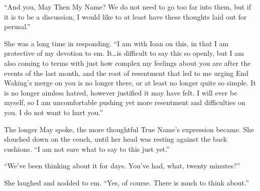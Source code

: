 ``And you, May Then My Name? We do not need to go too far into them, but if it is to be a discussion, I would like to at least have these thoughts laid out for perusal.''

She was a long time in responding. ``I am with Ioan on this, in that I am protective of my devotion to em. It\ldots is difficult to say this so openly, but I am also coming to terms with just how complex my feelings about you are after the events of the last month, and the root of resentment that led to me urging End Waking's merge on you is no longer there, or at least no longer quite so simple. It is no longer aimless hatred, however justified it may have felt. I will ever be myself, so I am uncomfortable pushing yet more resentment and difficulties on you. I do not want to hurt you.''

The longer May spoke, the more thoughtful True Name's expression became. She slouched down on the couch, until her head was resting against the back cushions. ``I am not sure what to say to this just yet.''

``We've been thinking about it for days. You've had, what, twenty minutes?''

She laughed and nodded to em. ``Yes, of course. There is much to think about.''
